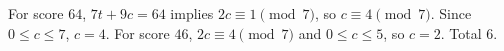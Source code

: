 For score $64$, $7t+9c=64$ implies $2c\equiv1\pmod7$, so $c\equiv4\pmod7$. Since $0\le c\le7$, $c=4$. For score $46$, $2c\equiv4\pmod7$ and $0\le c\le5$, so $c=2$. Total $\boxed6$.
